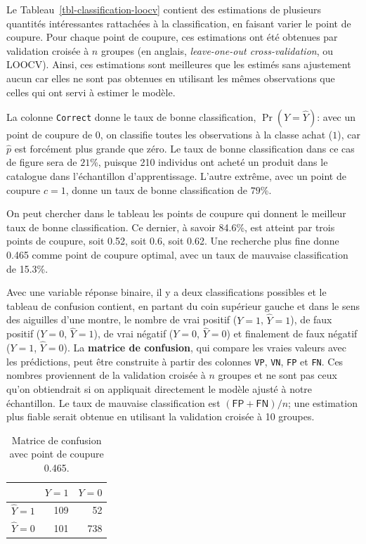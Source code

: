 \documentclass[
  11pt,
  letterpaper,
]{scrbook}
\theoremstyle{definition}
\theoremstyle{remark}
\begin{document}
Le Tableau~\ref{tbl-classification-loocv} contient des estimations de
plusieurs quantités intéressantes rattachées à la classification, en
faisant varier le point de coupure. Pour chaque point de coupure, ces
estimations ont été obtenues par validation croisée à \(n\) groupes (en
anglais, \emph{leave-one-out cross-validation}, ou LOOCV). Ainsi, ces
estimations sont meilleures que les estimés sans ajustement aucun car
elles ne sont pas obtenues en utilisant les mêmes observations que
celles qui ont servi à estimer le modèle.

La colonne \texttt{Correct} donne le taux de bonne classification,
\(\Pr(Y = \widehat{Y})\): avec un point de coupure de \(0\), on
classifie toutes les observations à la classe achat (\(1\)), car
\(\widehat{p}\) est forcément plus grande que zéro. Le taux de bonne
classification dans ce cas de figure sera de \(21\)\%, puisque 210
individus ont acheté un produit dans le catalogue dans l'échantillon
d'apprentissage. L'autre extrême, avec un point de coupure \(c=1\),
donne un taux de bonne classification de \(79\)\%.

On peut chercher dans le tableau les points de coupure qui donnent le
meilleur taux de bonne classification. Ce dernier, à savoir 84.6\%, est
atteint par trois points de coupure, soit 0.52, soit 0.6, soit 0.62. Une
recherche plus fine donne 0.465 comme point de coupure optimal, avec un
taux de mauvaise classification de 15.3\%.

Avec une variable réponse binaire, il y a deux classifications possibles
et le tableau de confusion contient, en partant du coin supérieur gauche
et dans le sens des aiguilles d'une montre, le nombre de vrai positif
(\(Y=1\), \(\widehat{Y}=1\)), de faux positif (\(Y=0\),
\(\widehat{Y}=1\)), de vrai négatif (\(Y=0\), \(\widehat{Y}=0\)) et
finalement de faux négatif (\(Y=1\), \(\widehat{Y}=0\)). La
\textbf{matrice de confusion}, qui compare les vraies valeurs avec les
prédictions, peut être construite à partir des colonnes \texttt{VP},
\texttt{VN}, \texttt{FP} et \texttt{FN}. Ces nombres proviennent de la
validation croisée à \(n\) groupes et ne sont pas ceux qu'on obtiendrait
si on appliquait directement le modèle ajusté à notre échantillon. Le
taux de mauvaise classification est \((\mathsf{FP}+\mathsf{FN})/n\); une
estimation plus fiable serait obtenue en utilisant la validation croisée
à 10 groupes.

\hypertarget{tbl-confumat}{}
\begin{table}
\caption{\label{tbl-confumat}Matrice de confusion avec point de coupure 0.465. }\tabularnewline

\centering
\begin{tabular}{lrr}
\toprule
  & \(Y=1\) & \(Y=0\)\\
\midrule
\(\widehat{Y}=1\) & 109 & 52\\
\(\widehat{Y}=0\) & 101 & 738\\
\bottomrule
\end{tabular}
\end{table}
\end{document}
